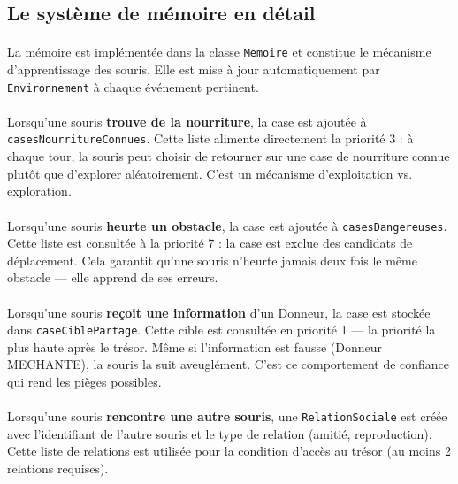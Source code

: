 \bigskip

\subsection{Le système de mémoire en détail}

\paragraph{} La mémoire est implémentée dans la classe \texttt{Memoire} et constitue le mécanisme d'apprentissage des souris. Elle est mise à jour automatiquement par \texttt{Environnement} à chaque événement pertinent.

\paragraph{} Lorsqu'une souris \textbf{trouve de la nourriture}, la case est ajoutée à \texttt{casesNourritureConnues}. Cette liste alimente directement la priorité 3 : à chaque tour, la souris peut choisir de retourner sur une case de nourriture connue plutôt que d'explorer aléatoirement. C'est un mécanisme d'exploitation vs. exploration.

\paragraph{} Lorsqu'une souris \textbf{heurte un obstacle}, la case est ajoutée à \texttt{casesDangereuses}. Cette liste est consultée à la priorité 7 : la case est exclue des candidats de déplacement. Cela garantit qu'une souris n'heurte jamais deux fois le même obstacle --- elle apprend de ses erreurs.

\paragraph{} Lorsqu'une souris \textbf{reçoit une information} d'un Donneur, la case est stockée dans \texttt{caseCiblePartage}. Cette cible est consultée en priorité 1 --- la priorité la plus haute après le trésor. Même si l'information est fausse (Donneur MECHANTE), la souris la suit aveuglément. C'est ce comportement de confiance qui rend les pièges possibles.

\paragraph{} Lorsqu'une souris \textbf{rencontre une autre souris}, une \texttt{RelationSociale} est créée avec l'identifiant de l'autre souris et le type de relation (amitié, reproduction). Cette liste de relations est utilisée pour la condition d'accès au trésor (au moins 2 relations requises).

